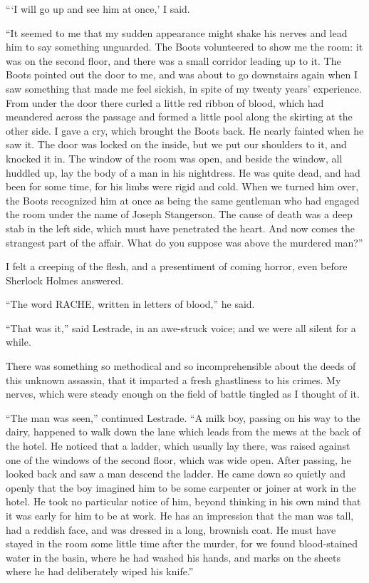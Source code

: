 \documentclass[12pt]{book}
\begin{document}
“‘I will go up and see him at once,’ I said. 

“It seemed to me that my sudden appearance might shake his nerves and lead him to say something unguarded. The Boots volunteered to show me the room: it was on the second floor, and there was a small corridor leading up to it. The Boots pointed out the door to me, and was about to go downstairs again when I saw something that made me feel sickish, in spite of my twenty years’ experience. From under the door there curled a little red ribbon of blood, which had meandered across the passage and formed a little pool along the skirting at the other side. I gave a cry, which brought the Boots back. He nearly fainted when he saw it. The door was locked on the inside, but we put our shoulders to it, and knocked it in. The window of the room was open, and beside the window, all huddled up, lay the body of a man in his nightdress. He was quite dead, and had been for some time, for his limbs were rigid and cold. When we turned him over, the Boots recognized him at once as being the same gentleman who had engaged the room under the name of Joseph Stangerson. The cause of death was a deep stab in the left side, which must have penetrated the heart. And now comes the strangest part of the affair. What do you suppose was above the murdered man?” 

I felt a creeping of the flesh, and a presentiment of coming horror, even before Sherlock Holmes answered. 

“The word RACHE, written in letters of blood,” he said. 

“That was it,” said Lestrade, in an awe-struck voice; and we were all silent for a while. 

There was something so methodical and so incomprehensible about the deeds of this unknown assassin, that it imparted a fresh ghastliness to his crimes. My nerves, which were steady enough on the field of battle tingled as I thought of it. 

“The man was seen,” continued Lestrade. “A milk boy, passing on his way to the dairy, happened to walk down the lane which leads from the mews at the back of the hotel. He noticed that a ladder, which usually lay there, was raised against one of the windows of the second floor, which was wide open. After passing, he looked back and saw a man descend the ladder. He came down so quietly and openly that the boy imagined him to be some carpenter or joiner at work in the hotel. He took no particular notice of him, beyond thinking in his own mind that it was early for him to be at work. He has an impression that the man was tall, had a reddish face, and was dressed in a long, brownish coat. He must have stayed in the room some little time after the murder, for we found blood-stained water in the basin, where he had washed his hands, and marks on the sheets where he had deliberately wiped his knife.” 
\end{document}
